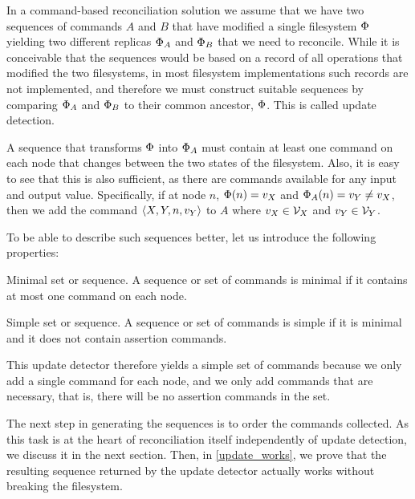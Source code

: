 
In a command-based reconciliation solution we assume that we have two sequences of commands
$A$ and $B$ that have modified a single filesystem $\Phi$ yielding two different replicas $\Phi_A$ and $\Phi_B$ that we
need to reconcile. While it is conceivable that the sequences would be based on a record of
all operations that modified the two filesystems, in most filesystem implementations
such records are not implemented, and therefore we must construct suitable sequences
by comparing $\Phi_A$ and $\Phi_B$ to their common ancestor, $\Phi$. This is called update detection.

A sequence that transforms $\Phi$ into $\Phi_A$ must contain at least one command on each node
that changes between the two states of the filesystem. Also, it is easy to see that this is also
sufficient, as there are commands available for any input and output value. 
Specifically, if at node $n$, $\Phi(n)=v_X$ and $\Phi_A(n)=v_Y\neq v_X$, then we add the command $\langle{X,Y,n,v_Y}\rangle$ to $A$
where $v_X\in\mathcal{V}_{X}$ and $v_Y\in\mathcal{V}_{Y}$.

To be able to describe such sequences better, let us introduce the following properties:

\begin{mydef}{Minimal set or sequence.}
A sequence or set of commands is minimal if it contains at most one command on each node.
\end{mydef}

\begin{mydef}{Simple set or sequence.}
A sequence or set of commands is simple if it is minimal and it does not contain assertion commands.
\end{mydef}

This update detector therefore yields a simple set of commands because we only add a single command
for each node, and we only add commands that are necessary, that is, there will be no 
assertion commands in the set.

The next step in generating the sequences is to order the commands collected.
As this task is at the heart of reconciliation itself independently of update detection,
we discuss it in the next section.
Then, in \cref{update_works}, we prove that the resulting sequence 
returned by the update detector actually works without breaking the filesystem.

